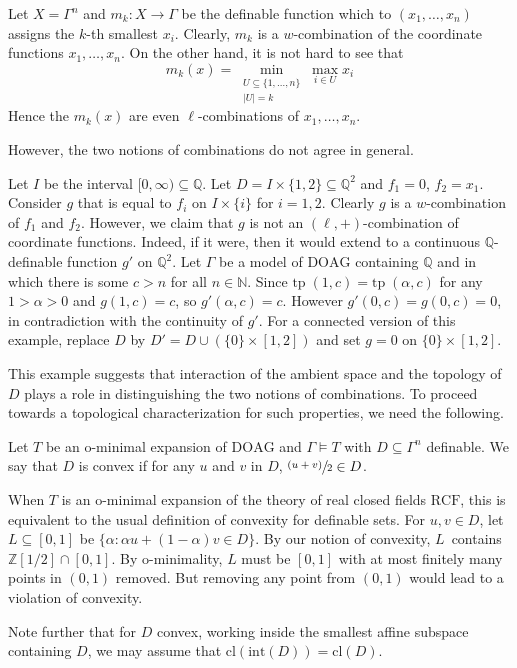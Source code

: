 \documentclass[JEP,XML,SOM,Unicode,ThmDefs,NoEqCountersInSection,published]{cedram}
\newcommand{\psfrac}[2]{\sfrac{(#1)}{#2}}
\newcommand{\cl}{\mathrm{cl}}
\newcommand{\tp}{\mathrm{tp\;}}
\newcommand{\DOAG}{\mathrm{DOAG}}
\newcommand{\N}{\mathbb N}
\newcommand{\Q}{\mathbb Q}
\newcommand{\Z}{\mathbb Z}
\theoremstyle{plain}
\theoremstyle{definition}
\begin{document}
\begin{exem}\label{eg:min-k}
Let $X=\Gamma^n$ and $m_k:X\to \Gamma$ be the definable function which to $(x_1,\ldots,x_n)$ assigns the $k$-th smallest $x_i$. Clearly, $m_k$ is a $w$-combination of the coordinate functions $x_1,\ldots,x_n$. On the other hand, it is not hard to see that
\[
m_k(x)=\min_{\substack{U\subseteq \{1,\ldots,n\}\\|U|=k}} \max_{i\in U} x_i
\]
Hence the $m_k(x)$ are even $\ell$-combinations of $x_1,\ldots,x_n$.
\end{exem}
However, the two notions of combinations do not agree in general.
\begin{exem}\label{eg:dl}
Let $I$ be the interval $[0,\infty)\subseteq \Q$.
Let $D= I\times \{1,2\}\subseteq\Q^2$ and $f_1=0$,
$f_2=x_1$. Consider $g$ that is equal to
$f_i$ on $I\times \{i\}$ for $i=1,2$. Clearly
$g$ is a $w$-combination of $f_1$ and $f_2$.
However, we claim that $g$ is not an $(\ell, +)$-combination
of coordinate functions.
Indeed, if it were, then it would extend to a continuous
$\Q$\nobreakdash-definable function $g'$ on $\Q^2$. Let $\Gamma$ be a model of $\DOAG$
containing $\Q$ and in which there is some $c>n$ for all $n\in\N$. Since $\tp(1,c)=\tp(\alpha,c)$ for any $1>\alpha>0$ and $g(1,c)=c$, so $g'(\alpha,c)=c$. However $g'(0,c)=g(0,c)=0$, in contradiction with the continuity of $g'$. For a connected version of this example, replace $D$ by $D'=D\cup (\{0\}\times [1,2])$ and set $g=0$ on $\{0\}\times [1,2]$.
\end{exem}
This example suggests that interaction of the ambient space and the topology of~$D$ plays a role in distinguishing the two notions of combinations. To proceed towards a topological characterization for such properties, we need the following.
\begin{defi}\label{def:convex} Let $T$ be an o-minimal expansion of $\DOAG$ and $\Gamma\models T$ with $D\subseteq \Gamma^n$ definable. We say that $D$ is convex if for any $u$
and $v$ in $D$, $\psfrac{u+v}{2}\in D$.
\end{defi}
\begin{rema}\label{rmk:rcf}
When $T$ is an o-minimal expansion of the theory of real closed fields $\mathrm{RCF}$, this is equivalent to the usual definition of convexity for definable sets. For $u,v\in D$, let $L\subseteq [0,1]$ be $\{\alpha: \alpha u+(1-\alpha)v \in D\}$. By our notion of convexity, $L$~contains $\Z[1/2]\cap [0,1]$. By o-minimality, $L$ must be $[0,1]$ with at most finitely many points in $(0,1)$ removed. But removing any point from $(0,1)$ would lead to a violation of convexity.

Note further that for $D$ convex, working inside the smallest affine subspace containing $D$, we may assume that $\cl(\mathrm{int}(D))=\cl(D)$.
\end{rema}
\end{document}
